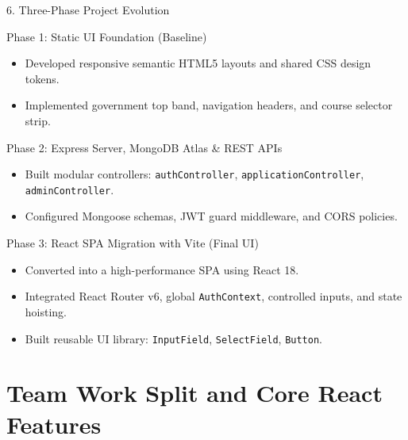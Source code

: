 \documentclass[aspectratio=169, 10pt]{beamer}
\begin{document}
\begin{frame}{6. Three-Phase Project Evolution}
  \small
  \begin{block}{Phase 1: Static UI Foundation (Baseline)}
    \begin{itemize}
      \item Developed responsive semantic HTML5 layouts and shared CSS design tokens.
      \item Implemented government top band, navigation headers, and course selector strip.
    \end{itemize}
  \end{block}
  \begin{block}{Phase 2: Express Server, MongoDB Atlas \& REST APIs}
    \begin{itemize}
      \item Built modular controllers: \texttt{authController}, \texttt{applicationController}, \texttt{adminController}.
      \item Configured Mongoose schemas, JWT guard middleware, and CORS policies.
    \end{itemize}
  \end{block}
  \begin{block}{Phase 3: React SPA Migration with Vite (Final UI)}
    \begin{itemize}
      \item Converted into a high-performance SPA using React 18.
      \item Integrated React Router v6, global \texttt{AuthContext}, controlled inputs, and state hoisting.
      \item Built reusable UI library: \texttt{InputField}, \texttt{SelectField}, \texttt{Button}.
    \end{itemize}
  \end{block}
\end{frame}

\section{Team Work Split and Core React Features}
\end{document}
